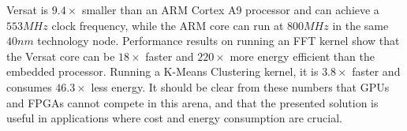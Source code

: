 \documentclass[journal]{IEEEtran}
\begin{document}
Versat is $9.4\times$ smaller than an ARM Cortex A9 processor and can
achieve a $553MHz$ clock frequency, while the ARM core can run at
$800MHz$ in the same $40nm$ technology node. Performance results on
running an FFT kernel show that the Versat core can be $18\times$
faster and $220\times$ more energy efficient than the embedded
processor. Running a K-Means Clustering kernel, it is $3.8\times$
faster and consumes $46.3\times$ less energy. It should be clear from
these numbers that GPUs and FPGAs cannot compete in this arena, and
that the presented solution is useful in applications where cost and
energy consumption are crucial.




%
%

\end{document}
